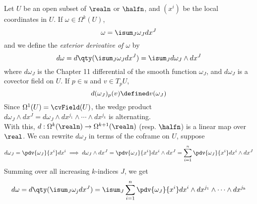 \documentclass[../main-v2-manifolds.tex]{subfiles}
\begin{document}
\begin{definition}
    Let $U$ be an open subset of $\realn$ or $\halfn$, and $(x^i)$ be the local coordinates in $U$. If $\omega\in\Omega^k(U)$, 
    \[
        \omega = \isum_J\omega_Jdx^J
    \]
    and we define the \emph{exterior derivative of $\omega$} by
    \[
        d\omega = d\qty(\isum_J\omega_J dx^J) = \isum_J d\omega_J\wedge dx^J
    \]
    where $d\omega_J$ is the Chapter 11 differential of the smooth function $\omega_J$, and $d\omega_J$ is a covector field on $U$. If $p\in u$ and $v\in T_p U$, 
    \[
        d(\omega_J)_p(v) \defined v(\omega_J)
    \]
    Since $\Omega^1(U) = \cvField(U)$, the wedge product $d\omega_J\wedge dx^J = d\omega_J\wedge dx^{j_1}\wedge\cdots\wedge dx^{j_k}$ is alternating. \\

    With this, $d: \Omega^{k}(\realn)\to \Omega^{k+1}(\realn)$ (resp. $\halfn$) is a linear map over $\real$. We can rewrite $d\omega_J$ in terms of the coframe on $U$, suppose
    \[
        d\omega_J = \pdv{\omega_J}{x^i}dx^i\implies d\omega_J\wedge dx^J = \pdv{\omega_J}{x^i}dx^i\wedge dx^J = \sum_{i=1}^n\pdv{\omega_J}{x^i}dx^i\wedge dx^J
    \]
    Summing over all increasing $k$-indices $J$, we get
    \[
        d\omega = d\qty(\isum_J \omega_j dx^J) = \isum_J\sum_{i=1}^n\pdv{\omega_J}{x^i}dx^i\wedge dx^{j_1}\wedge\cdots\wedge dx^{j_k}
    \]
\end{definition}
\end{document}
